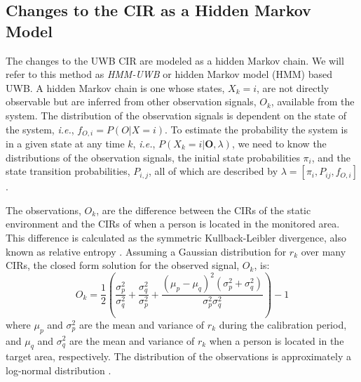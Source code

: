 \documentclass[conference]{IEEEtran}
\begin{document}
\subsection{Changes to the CIR as a Hidden Markov Model} \label{sec:uwb_hmm}

The changes to the UWB CIR are modeled as a hidden Markov chain. We
will refer to this method as \emph{HMM-UWB} or hidden Markov model
(HMM) based UWB. A hidden Markov chain is one whose states, $X_k=i$,
are not directly observable but are inferred from other observation
signals, $O_k$, available from the system. The distribution of the
observation signals is dependent on the state of the system,
\emph{i.e.}, $f_{O,i}=P(O|X=i)$. To estimate the probability the
system is in a given state at any time $k$, \emph{i.e.},
$P(X_k=i|\mathbf{O},\lambda)$, we need to know the distributions of
the observation signals, the initial state probabilities $\pi_i$, and
the state transition probabilities, $P_{i,j}$, all of which are
described by $\lambda = \left[ \pi_i, P_{ij}, f_{O,i} \right]$
\cite{Rabiner}.

The observations, $O_k$, are the difference between the CIRs of the
static environment and the CIRs of when a person is located in the
monitored area. This difference is calculated as the symmetric
Kullback-Leibler divergence, also known as relative entropy
\cite{Cover}. Assuming a Gaussian distribution for $r_k$ over many
CIRs, the closed form solution for the observed signal, $O_k$, is:
\begin{equation} \label{E:kld} O_k =
\frac{1}{2}\left(\frac{\sigma_p^2}{\sigma_q^2} +
\frac{\sigma_q^2}{\sigma_p^2} + \frac{\left(\mu_p-\mu_q\right)^2
\left(\sigma_p^2 + \sigma_q^2\right)}{ \sigma_p^2\sigma_q^2}\right) -
1
\end{equation} where $\mu_p$ and $\sigma_p^2$ are the mean and
variance of $r_k$ during the calibration period, and $\mu_q$ and $
\sigma_q^2$ are the mean and variance of $r_k$ when a person is
located in the target area, respectively. The distribution of the
observations is approximately a log-normal distribution \cite{Wisnet}.
\end{document}
